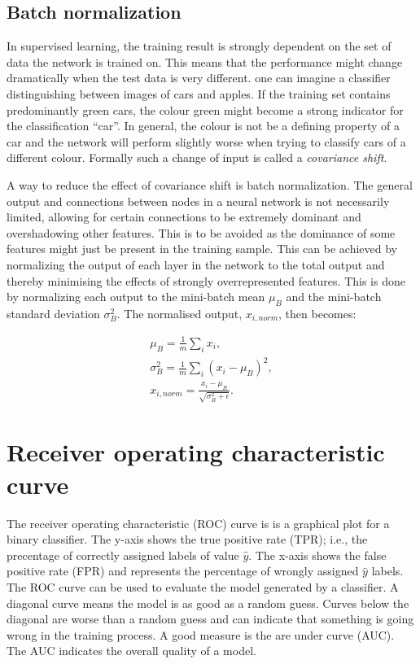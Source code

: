 \subsection{Batch normalization}
\label{sec:batch_norm}

In supervised learning, the training result is strongly dependent on the set of data the network is trained on. This means that the performance might change dramatically when the test data is very different. one can imagine a classifier distinguishing between images of cars and apples. If the training set contains predominantly green cars, the colour green might become a strong indicator for the classification \enquote{car}. In general, the colour is not be a defining property of a car and the network will perform slightly worse when trying to classify cars of a different colour. Formally such a change of input is called a \emph{covariance shift}.

A way to reduce the effect of covariance shift is batch normalization. The general output and connections between nodes in a neural network is not necessarily limited, allowing for certain connections to be extremely dominant and overshadowing other features. This is to be avoided as the dominance of some features might just be present in the training sample. This can be achieved by normalizing the output of each layer in the network to the total output and thereby minimising the effects of strongly overrepresented features. This is done by normalizing each output to the mini-batch mean $\mu_B$ and the mini-batch standard deviation $\sigma_B^2$. The normalised output, $x_{i,norm}$, then becomes:

\begin{align}
    \mu_B = \frac{1}{m} \sum_i x_i,\\
    \sigma_B^2 = \frac{1}{m} \sum_i (x_i - \mu_B)^2,\\
    x_{i,norm} = \frac{x_i - \mu_B}{\sqrt{\sigma_B^2 + \epsilon}}.
\end{align}

\section{Receiver operating characteristic curve}

The receiver operating characteristic (ROC) curve is is a graphical plot for a binary classifier. The y-axis shows the true positive rate (TPR); {i.e.}, the precentage of correctly assigned labels of value $\hat{y}$. The x-axis shows the false positive rate (FPR) and represents the percentage of wrongly assigned $\hat{y}$ labels. The ROC curve can be used to evaluate the model generated by a classifier. A diagonal curve means the model is as good as a random guess. Curves below the diagonal are worse than a random guess and can indicate that something is going wrong in the training process. A good measure is the are under curve (AUC). The AUC indicates the overall quality of a model.





